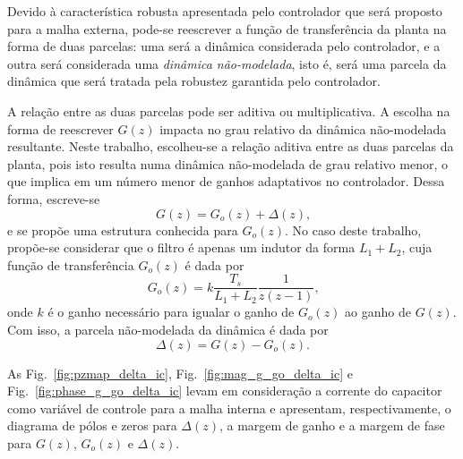   Devido à característica robusta apresentada pelo controlador que será proposto para a malha externa, pode-se reescrever a função de transferência da planta na forma de duas parcelas: uma será a dinâmica considerada pelo controlador, e a outra será considerada uma \emph{dinâmica não-modelada}, isto é, será uma parcela da dinâmica que será tratada pela robustez garantida pelo controlador.

  A relação entre as duas parcelas pode ser aditiva ou multiplicativa. A escolha na forma de reescrever $G(z)$ impacta no grau relativo da dinâmica não-modelada resultante. Neste trabalho, escolheu-se a relação aditiva entre as duas parcelas da planta, pois isto resulta numa dinâmica não-modelada de grau relativo menor, o que implica em um número menor de ganhos adaptativos no controlador. Dessa forma, escreve-se
  \begin{equation}
    G(z) = G_o(z) + \Delta(z) \text{,}
    \label{eq:planta_go_delta_aditiva}
  \end{equation}
  e se propõe uma estrutura conhecida para $G_o(z)$. No caso deste trabalho, propõe-se considerar que o filtro é apenas um indutor da forma $L_1 + L_2$, cuja função de transferência $G_o(z)$ é dada por
  \begin{equation}
    G_o(z) = k \frac{T_s}{L_1+L_2} \frac{1}{z(z-1)} \text{,}
    \label{eq:go_L1_L2}
  \end{equation}
  onde $k$ é o ganho necessário para igualar o ganho de $G_o(z)$ ao ganho de $G(z)$. Com isso, a parcela não-modelada da dinâmica é dada por
  \begin{equation}
    \Delta(z) = G(z) - G_o(z) \text{.}
    \label{eq:dnm_deltaz}
  \end{equation}

  As Fig.~\ref{fig:pzmap_delta_ic}, Fig.~\ref{fig:mag_g_go_delta_ic} e Fig.~\ref{fig:phase_g_go_delta_ic} levam em consideração a corrente do capacitor como variável de controle para a malha interna e apresentam, respectivamente, o diagrama de pólos e zeros para $\Delta(z)$, a margem de ganho e a margem de fase para $G(z)$, $G_o(z)$ e $\Delta(z)$.

  \vspace{\fill}
  \noindent
  \begin{minipage}{\textwidth}
    \makebox[\textwidth]{
      \centering
      \def\svgwidth{\textwidth}
      }
    \label{fig:pzmap_delta_ic}
  \end{minipage}
  \vspace{\fill}

